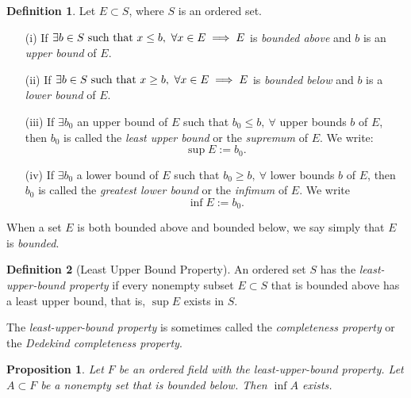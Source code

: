 \documentclass{article}
\newtheorem{proposition}{Proposition}[section]
\theoremstyle{definition}
\newtheorem{definition}{Definition}[section]
\theoremstyle{remark}
\begin{document}
\begin{definition} \label{def:bounded_set}
Let \( E \subset S \), where \( S \) is an ordered set.
\begin{itemize}
\item[(i)] If \( \exists b \in S \textnormal{ such that } x \leq b, \ \forall x \in E \implies E \) is \textit{bounded above} and \( b \) is an \textit{upper bound} of \( E \).
\item[(ii)] If \( \exists b \in S \textnormal{ such that } x \geq b, \ \forall x \in E \implies E \) is \textit{bounded below} and \( b \) is a \textit{lower bound} of \( E \).
\item[(iii)] If \( \exists b_0 \) an upper bound of \( E \) such that \( b_0 \leq b, \ \forall \) upper bounds \( b \) of \( E \), then \( b_0 \) is called the \textit{least upper bound} or the \textit{supremum} of \( E \). We write:
\[
\sup E := b_0.
\]
\item[(iv)] If \( \exists b_0 \) a lower bound of \( E \) such that \( b_0 \geq b, \ \forall \) lower bounds \( b \) of \( E \), then \( b_0 \) is called the \textit{greatest lower bound} or the \textit{infimum} of \( E \). We write
\[
\inf E := b_0.
\]
\end{itemize}
When a set \( E \) is both bounded above and bounded below, we say simply that \( E \) is \textit{bounded}.
\end{definition}













\begin{definition}[Least Upper Bound Property]\label{def:lub_property}
An ordered set $S$ has the \textit{least-upper-bound property} if every nonempty subset $ E \subset S$ that is bounded above has a least upper bound, that is, $ \sup E$ exists in $S$.
\begin{center}
The \textit{least-upper-bound property} is sometimes called the \textit{completeness property} or the \textit{Dedekind completeness property}.
\end{center}

\end{definition}






\begin{proposition} \label{prop:infimum_exists}
Let \( F \) be an ordered field with the least-upper-bound property. Let \( A \subset F \) be a nonempty set that is bounded below. Then \( \inf A \) exists.
\end{proposition}
\end{document}

